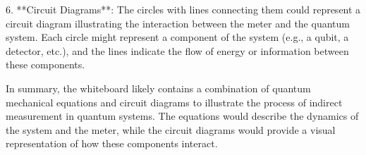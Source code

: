 6. **Circuit Diagrams**: The circles with lines connecting them could represent a circuit diagram illustrating the interaction between the meter and the quantum system. Each circle might represent a component of the system (e.g., a qubit, a detector, etc.), and the lines indicate the flow of energy or information between these components.

In summary, the whiteboard likely contains a combination of quantum mechanical equations and circuit diagrams to illustrate the process of indirect measurement in quantum systems. The equations would describe the dynamics of the system and the meter, while the circuit diagrams would provide a visual representation of how these components interact.